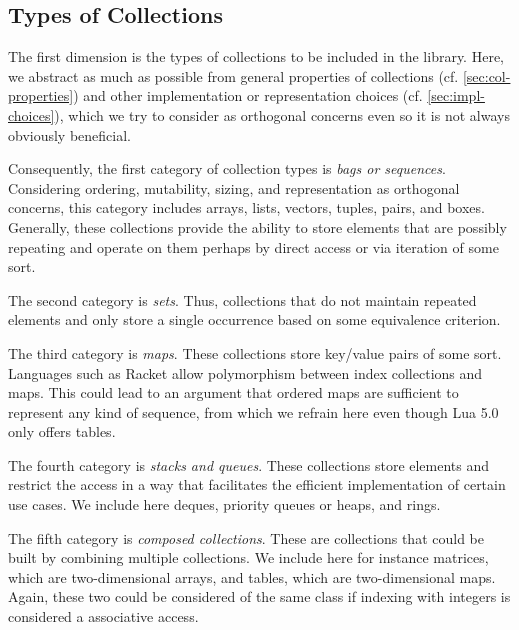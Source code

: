 \documentclass[sigconf, 10pt]{acmart}
\begin{document}
\subsection{Types of Collections}

The first dimension is the types of collections to be included in the library.
Here, we abstract as much as possible
from general properties of collections (cf. \cref{sec:col-properties})
and other implementation or representation choices
(cf. \cref{sec:impl-choices}),
which we try to consider as orthogonal concerns
even so it is not always obviously beneficial.

Consequently,
the first category of collection types is \emph{bags or sequences}.
Considering ordering, mutability, sizing, and representation
as orthogonal concerns,
this category includes arrays, lists, vectors, tuples, pairs, and boxes.
Generally, these collections provide the ability to store elements
that are possibly repeating
and operate on them perhaps by direct access or via iteration of some sort.

The second category is \emph{sets}.
Thus, collections that do not maintain repeated elements
and only store a single occurrence based on some equivalence criterion.

The third category is \emph{maps}.
These collections store key/value pairs of some sort.
Languages such as Racket allow polymorphism between index collections and maps.
This could lead to an argument that ordered maps are sufficient to represent
any kind of sequence,
from which we refrain here even though Lua 5.0 only offers tables\citep{The_implementation_of_lua}.

The fourth category is \emph{stacks and queues}.
These collections store elements
and restrict the access in a way
that facilitates the efficient implementation of certain use cases.
We include here deques, priority queues or heaps, and rings.

The fifth category is \emph{composed collections}.
These are collections that could be built by combining multiple collections.
We include here for instance matrices, which are two-dimensional arrays,
and tables, which are two-dimensional maps.
Again, these two could be considered of the same class
if indexing with integers is considered a associative access.
\end{document}
